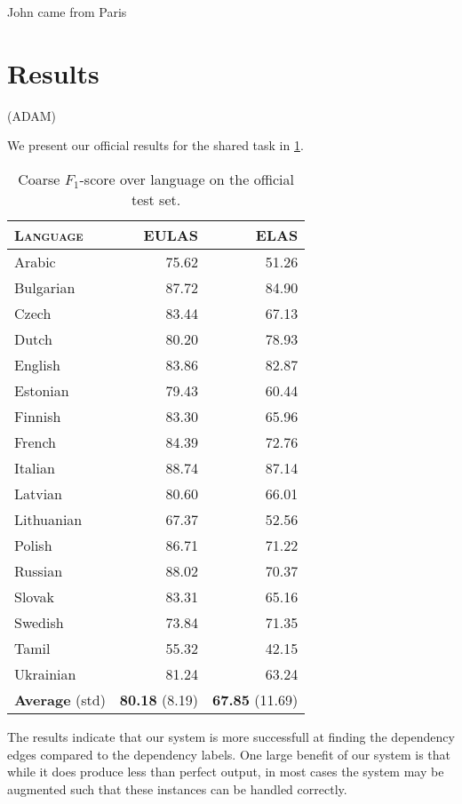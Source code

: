 \documentclass[11pt,a4paper]{article}
\begin{document}
John came from Paris


\section{Results}
(ADAM)

We present our official results for the shared task in \cref{tab:test}. 

\begin{table}[h]
	\centering
	\begin{tabular}{l|rr}
		\textsc{Language} & \textsc{EULAS} & \textsc{ELAS} \\
		\hline
		Arabic & 75.62 & 51.26 \\
		Bulgarian & 87.72 & 84.90 \\
		Czech & 83.44 & 67.13 \\
		Dutch & 80.20 & 78.93 \\
		English & 83.86 & 82.87 \\
		Estonian & 79.43 & 60.44 \\
		Finnish & 83.30 & 65.96 \\
		French & 84.39 & 72.76 \\
		Italian & 88.74 & 87.14 \\
		Latvian & 80.60 & 66.01 \\
		Lithuanian & 67.37 & 52.56 \\
		Polish & 86.71 & 71.22 \\
		Russian & 88.02 & 70.37 \\
		Slovak & 83.31 & 65.16 \\
		Swedish & 73.84 & 71.35 \\
		Tamil & 55.32 & 42.15 \\
		Ukrainian & 81.24 & 63.24 \\
		\textbf{Average} (std) & \textbf{80.18} (8.19) & \textbf{67.85} (11.69) \\
	\end{tabular}
\caption{\label{tab:test} Coarse $F_1$-score over language on the official test set.}
\end{table}

The results indicate that our system is more successfull at
finding the dependency edges compared to the dependency
labels. One large benefit of our system is that while it does
produce less than perfect output, in most cases the system may be
augmented such that these instances can be handled correctly.
\end{document}
